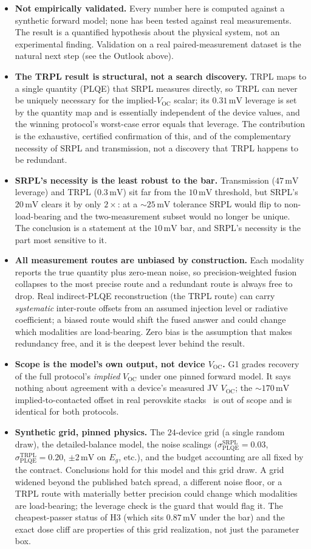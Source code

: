 \documentclass[11pt]{article}
\newcommand{\Voc}{V_{\mathrm{OC}}}
\newcommand{\mV}{\,\mathrm{mV}}
\begin{document}
\begin{itemize}
\item \textbf{Not empirically validated.} Every number here is computed against a synthetic forward model; none has been tested against real measurements. The result is a quantified hypothesis about the physical system, not an experimental finding. Validation on a real paired-measurement dataset is the natural next step (see the Outlook above).
\item \textbf{The TRPL result is structural, not a search discovery.} TRPL maps to a single quantity (PLQE) that SRPL measures directly, so TRPL can never be uniquely necessary for the implied-$\Voc$ scalar; its $0.31\mV$ leverage is set by the quantity map and is essentially independent of the device values, and the winning protocol's worst-case error equals that leverage. The contribution is the exhaustive, certified confirmation of this, and of the complementary necessity of SRPL and transmission, not a discovery that TRPL happens to be redundant.
\item \textbf{SRPL's necessity is the least robust to the bar.} Transmission ($47\mV$ leverage) and TRPL ($0.3\mV$) sit far from the $10\mV$ threshold, but SRPL's $20\mV$ clears it by only $2\times$: at a ${\sim}25\mV$ tolerance SRPL would flip to non-load-bearing and the two-measurement subset would no longer be unique. The conclusion is a statement at the $10\mV$ bar, and SRPL's necessity is the part most sensitive to it.
\item \textbf{All measurement routes are unbiased by construction.} Each modality reports the true quantity plus zero-mean noise, so precision-weighted fusion collapses to the most precise route and a redundant route is always free to drop. Real indirect-PLQE reconstruction (the TRPL route) can carry \emph{systematic} inter-route offsets from an assumed injection level or radiative coefficient; a biased route would shift the fused answer and could change which modalities are load-bearing. Zero bias is the assumption that makes redundancy free, and it is the deepest lever behind the result.
\item \textbf{Scope is the model's own output, not device $\Voc$.} G1 grades recovery of the full protocol's \emph{implied} $\Voc$ under one pinned forward model. It says nothing about agreement with a device's measured JV $\Voc$; the ${\sim}170\mV$ implied-to-contacted offset in real perovskite stacks~\cite{louks2025} is out of scope and is identical for both protocols.
\item \textbf{Synthetic grid, pinned physics.} The $24$-device grid (a single random draw), the detailed-balance model, the noise scalings ($\sigma_{\mathrm{PLQE}}^{\mathrm{SRPL}}=0.03$, $\sigma_{\mathrm{PLQE}}^{\mathrm{TRPL}}=0.20$, $\pm2\mV$ on $E_g$, etc.), and the budget accounting are all fixed by the contract. Conclusions hold for this model and this grid draw. A grid widened beyond the published batch spread, a different noise floor, or a TRPL route with materially better precision could change which modalities are load-bearing; the leverage check is the guard that would flag it. The cheapest-passer status of H3 (which sits $0.87\mV$ under the bar) and the exact dose cliff are properties of this grid realization, not just the parameter box.

\end{itemize}
\end{document}
